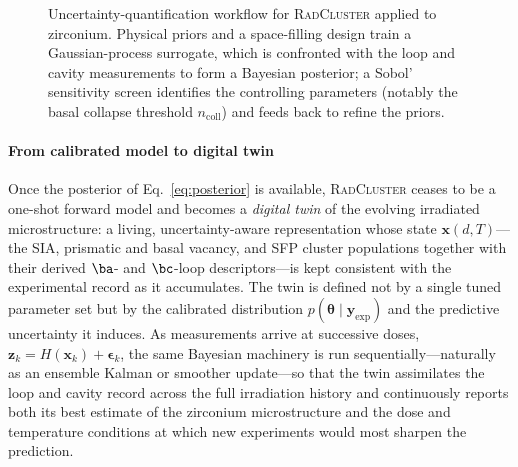 \begin{figure}[htbp]
\centering
{}
\caption{Uncertainty-quantification workflow for \textsc{RadCluster}
applied to zirconium. Physical priors and a space-filling design train a
Gaussian-process surrogate, which is confronted with the loop and cavity
measurements to form a Bayesian posterior; a Sobol' sensitivity screen
identifies the controlling parameters (notably the basal collapse
threshold $n_{\mathrm{coll}}$) and feeds back to refine the priors.}
\label{fig:uq_workflow}
\end{figure}

\paragraph{From calibrated model to digital twin}
Once the posterior of Eq.~\eqref{eq:posterior} is available,
\textsc{RadCluster} ceases to be a one-shot forward model and becomes a
\emph{digital twin} of the evolving irradiated microstructure: a living,
uncertainty-aware representation whose state $\mathbf{x}(d,T)$---the SIA,
prismatic and basal vacancy, and SFP cluster populations together with
their derived $\ba$- and $\bc$-loop descriptors---is kept consistent with
the experimental record as it accumulates. The twin is defined not by a
single tuned parameter set but by the calibrated distribution
$p(\boldsymbol{\theta}\mid\mathbf{y}_{\mathrm{exp}})$ and the predictive
uncertainty it induces. As measurements arrive at successive doses,
$\mathbf{z}_k=H(\mathbf{x}_k)+\boldsymbol{\epsilon}_k$, the same Bayesian
machinery is run sequentially---naturally as an ensemble Kalman or smoother
update---so that the twin assimilates the loop and cavity record across the
full irradiation history and continuously reports both its best estimate of
the zirconium microstructure and the dose and temperature conditions at
which new experiments would most sharpen the prediction.

